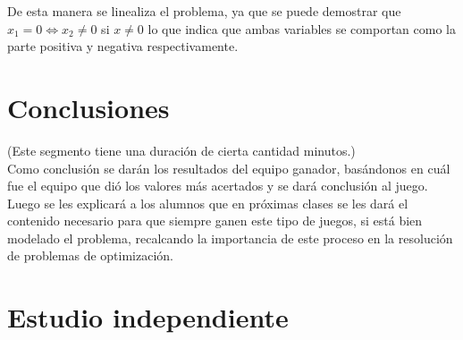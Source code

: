 \documentclass[a4paper,10pt,twocolumn]{article}
\theoremstyle{theorem}
\theoremstyle{definition}
\theoremstyle{remark}
\begin{document}
De esta manera se linealiza el problema, ya que se puede demostrar que $x_1 = 0 \iff x_2 \neq 0$ si $x \neq 0$ lo que indica que ambas variables se comportan como la parte positiva y negativa respectivamente.

\section{Conclusiones} \label{sec:conc}

(Este segmento tiene una duración de cierta cantidad minutos.)\\
 
%

Como conclusión se darán los resultados del equipo ganador, basándonos en cuál fue el equipo que dió los valores más acertados y se dará conclusión al juego.\\

Luego se les explicará a los alumnos que en próximas clases se les dará el contenido necesario para que siempre ganen este tipo de juegos, si está bien modelado el problema, recalcando la importancia de este proceso en la resolución de problemas de optimización.

\section{Estudio independiente} \label{independ}
\end{document}
